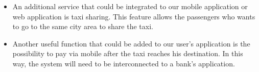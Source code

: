 \begin{itemize}
	\item An additional service that could be integrated to our mobile application or web application is taxi sharing. This feature allows the passengers who wants to go to the same city area to share the taxi.
	\item Another useful function that could be added to our user's application is the possibility to pay via mobile after the taxi reaches his destination.
	In this way, the system will need to be interconnected to a bank's application.
\end{itemize}